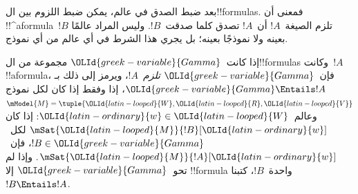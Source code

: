 \documentclass[../../../include/open-logic-section]{subfiles}
\begin{document}


\begin{explain}
  بعد ضبط الصدق في عالم، يمكن ضبط اللزوم بين ال!!{formula}s.
  فمعنى أن !!^a{formula}~$!B$ تلزم الصيغة~$!A$ أن~$!A$
  تصدق كلما صدقت~$!B$. وليس المراد عالمًا بعينه ولا نموذجًا بعينه؛
  بل يجري هذا الشرط في أي عالم من أي نموذج.
\end{explain}

\begin{defn}
  إذا كانت~$\OLId{greek-variable}{Gamma}$ مجموعة من ال!!{formula}s وكانت~$!A$ !!a{formula}،
  فإن~$\OLId{greek-variable}{Gamma}$ \emph{تلزم}~$!A$، ويرمز إلى ذلك بـ
  $\OLId{greek-variable}{Gamma} \Entails !A$، إذا وفقط إذا كان لكل نموذج
  $\mModel{M} = \tuple{\OLId{latin-looped}{W}, \OLId{latin-looped}{R}, \OLId{latin-looped}{V}}$ وعالم~$\OLId{latin-ordinary}{w} \in \OLId{latin-looped}{W}$: إذا كان
  $\mSat{\OLId{latin-looped}{M}}{!B}[\OLId{latin-ordinary}{w}]$ لكل~$!B \in \OLId{greek-variable}{Gamma}$، فإن~$\mSat{\OLId{latin-looped}{M}}{!A}[\OLId{latin-ordinary}{w}]$.
  وإذا لم تحو~$\OLId{greek-variable}{Gamma}$ إلا !!{formula} واحدة~$!B$، كتبنا
  $!B \Entails !A$.
\end{defn}
\end{document}
